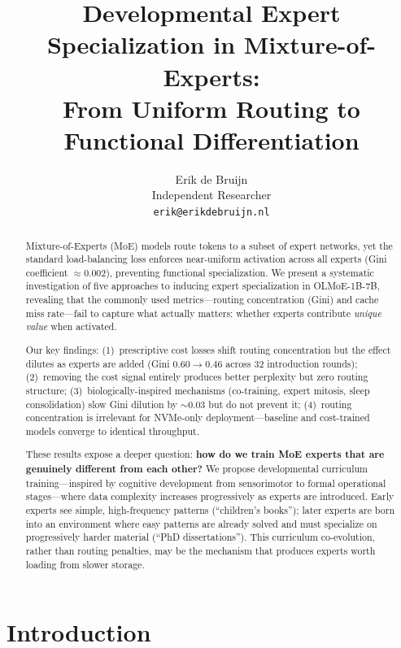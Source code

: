 \documentclass{article}
\title{Developmental Expert Specialization in Mixture-of-Experts:\\ From Uniform Routing to Functional Differentiation}
\author{
  Erik de Bruijn \\
  Independent Researcher \\
  \texttt{erik@erikdebruijn.nl}
}
\begin{document}
\maketitle

\begin{abstract}
Mixture-of-Experts (MoE) models route tokens to a subset of expert networks, yet the standard load-balancing loss enforces near-uniform activation across all experts (Gini coefficient $\approx$0.002), preventing functional specialization.
We present a systematic investigation of five approaches to inducing expert specialization in OLMoE-1B-7B, revealing that the commonly used metrics---routing concentration (Gini) and cache miss rate---fail to capture what actually matters: whether experts contribute \emph{unique value} when activated.

Our key findings: (1)~prescriptive cost losses shift routing concentration but the effect dilutes as experts are added (Gini 0.60$\to$0.46 across 32 introduction rounds); (2)~removing the cost signal entirely produces better perplexity but zero routing structure; (3)~biologically-inspired mechanisms (co-training, expert mitosis, sleep consolidation) slow Gini dilution by $\sim$0.03 but do not prevent it; (4)~routing concentration is irrelevant for NVMe-only deployment---baseline and cost-trained models converge to identical throughput.

These results expose a deeper question: \textbf{how do we train MoE experts that are genuinely different from each other?}
We propose developmental curriculum training---inspired by cognitive development from sensorimotor to formal operational stages---where data complexity increases progressively as experts are introduced.
Early experts see simple, high-frequency patterns (``children's books''); later experts are born into an environment where easy patterns are already solved and must specialize on progressively harder material (``PhD dissertations'').
This curriculum co-evolution, rather than routing penalties, may be the mechanism that produces experts worth loading from slower storage.
\end{abstract}

\section{Introduction}
\end{document}
